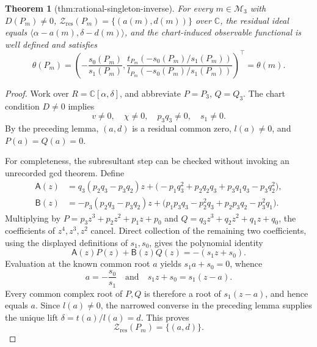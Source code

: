 \documentclass{article}
\newtheorem{theorem}{Theorem}
\begin{document}
\begin{theorem}[thm:rational-singleton-inverse]\label{thm:rational-singleton-inverse}
For every \(m\in\mathcal M_3\) with \(D(P_m)\neq0\), \(\mathcal Z_{\mathrm{res}}(P_m)=\{(a(m),d(m))\}\) over \(\mathbb C\), the residual ideal equals \(\langle\alpha-a(m),\delta-d(m)\rangle\), and the chart-induced observable functional is well defined and satisfies \[\theta(P_m)=\left(-\frac{s_0(P_m)}{s_1(P_m)},\frac{t_{P_m}(-s_0(P_m)/s_1(P_m))}{l_{P_m}(-s_0(P_m)/s_1(P_m))}\right)^\top=\theta(m).\]
\end{theorem}
\begin{proof}
Work over \(R=\mathbb C[\alpha,\delta]\), and abbreviate \(P=P_3\), \(Q=Q_3\). The chart condition \(D\neq0\) implies
\[
v\neq0,
\quad \chi\neq0,
\quad p_3q_3\neq0,
\quad s_1\neq0.
\]
By the preceding lemma, \((a,d)\) is a residual common zero, \(l(a)\neq0\), and \(P(a)=Q(a)=0\).

For completeness, the subresultant step can be checked without invoking an unrecorded gcd theorem. Define
\[
\begin{aligned}
\mathsf A(z)
&=q_3(p_2q_3-p_3q_2)z
+  \bigl(-p_1q_3^2+p_2q_2q_3+p_3q_1q_3-p_3q_2^2\bigr),\\
\mathsf B(z)
&=-p_3(p_2q_3-p_3q_2)z
+  \bigl(p_1p_3q_3-p_2^2q_3+p_2p_3q_2-p_3^2q_1\bigr).
\end{aligned}
\]
Multiplying by \(P=p_3z^3+p_2z^2+p_1z+p_0\) and \(Q=q_3z^3+q_2z^2+q_1z+q_0\), the coefficients of \(z^4,z^3,z^2\) cancel. Direct collection of the remaining two coefficients, using the displayed definitions of \(s_1,s_0\), gives the polynomial identity
\[
\mathsf A(z)P(z)+\mathsf B(z)Q(z)=-(s_1z+s_0).
\]
Evaluation at the known common root \(a\) yields \(s_1a+s_0=0\), whence
\[
a=-\frac{s_0}{s_1}
\quad\text{and}\quad
s_1z+s_0=s_1(z-a).
\]
Every common complex root of \(P,Q\) is therefore a root of \(s_1(z-a)\), and hence equals \(a\). Since \(l(a)\neq0\), the narrowed converse in the preceding lemma supplies the unique lift \(\delta=t(a)/l(a)=d\). This proves
\[
\mathcal Z_{\mathrm{res}}(P_m)=\{(a,d)\}.
\]


\end{proof}
\end{document}
